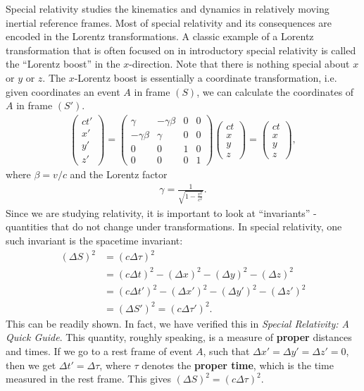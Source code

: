 \documentclass{article}
\theoremstyle{definition}
\begin{document}
Special relativity studies the kinematics and dynamics in relatively moving inertial reference frames. Most of special relativity and its consequences are encoded in the Lorentz transformations. A classic example of a Lorentz transformation that is often focused on in introductory special relativity is called the ``Lorentz boost'' in the $x$-direction. Note that there is nothing special about $x$ or $y$ or $z$. The $x$-Lorentz boost is essentially a coordinate transformation, i.e. given coordinates an event $A$ in frame $(S)$, we can calculate the coordinates of $A$ in frame $(S')$.
\begin{align*}
\begin{pmatrix}
ct'\\x'\\y'\\z'
\end{pmatrix}
=
\begin{pmatrix}
\gamma & -\gamma\beta & 0 & 0\\
-\gamma\beta & \gamma & 0 & 0\\
0 & 0 & 1 & 0\\
0 & 0 & 0 & 1
\end{pmatrix}
\begin{pmatrix}
ct\\x\\y\\z
\end{pmatrix}
=
\begin{pmatrix}
ct\\x\\y\\z
\end{pmatrix},
\end{align*}
where $\beta = v/c$ and the Lorentz factor 
\begin{align*}
\gamma = \frac{1}{\sqrt{1-\frac{v^2}{c^2}}}.
\end{align*}
Since we are studying relativity, it is important to look at ``invariants'' - quantities that do not change under transformations. In special relativity, one such invariant is the spacetime invariant:
\begin{align*}
(\Delta S)^2 &= (c\Delta \tau)^2\\
&= (c\Delta t)^2 - (\Delta x)^2 - (\Delta y)^2 - (\Delta z)^2\\
&= (c\Delta t')^2 - (\Delta x')^2 - (\Delta y')^2 - (\Delta z')^2\\
&= (\Delta S')^2 = (c\Delta \tau')^2.
\end{align*}
This can be readily shown. In fact, we have verified this in \textit{Special Relativity: A Quick Guide}. This quantity, roughly speaking, is a measure of \textbf{proper} distances and times. If we go to a rest frame of event $A$, such that $\Delta x' = \Delta y' = \Delta z' = 0$, then we get $\Delta t' = \Delta \tau$, where $\tau$ denotes the \textbf{proper time}, which is the time measured in the rest frame. This gives $(\Delta S)^2 = (c\Delta \tau)^2$.\\
\end{document}
